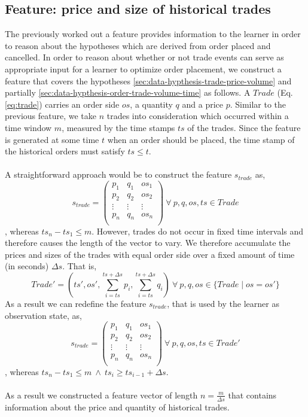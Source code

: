 \subsection{Feature: price and size of historical trades}
The previously worked out a feature provides information to the learner in order to reason about the hypotheses which are derived from order placed and cancelled.
In order to reason about whether or not trade events can serve as appropriate input for a learner to optimize order placement, we construct a feature that covers the hypotheses \ref{sec:data-hypthesis-trade-price-volume} and partially \ref{sec:data-hypthesis-order-trade-volume-time} as follows.
A $Trade$ (Eq. \ref{eq:trade}) carries an order side $os$, a quantity $q$ and a price $p$.
Similar to the previous feature, we take $n$ trades into consideration which occurred within a time window $m$, measured by the time stamps $ts$ of the trades.
Since the feature is generated at some time $t$ when an order should be placed, the time stamp of the historical orders must satisfy $ts \leq t$.
\\
\\
A straightforward approach would be to construct the feature $s_{trade}$ as,
\begin{equation}
    s_{trade} =\begin{pmatrix}
        p_1 & q_1 & os_1 \\
        p_2 & q_2 & os_2 \\
        \vdots & \vdots & \vdots\\
        p_n & q_n & os_n \\
    \end{pmatrix}
    \ \forall \ p, q, os, ts \in Trade
\end{equation}, whereas $ts_n - ts_1 \leq m$.
However, trades do not occur in fixed time intervals and therefore causes the length of the vector to vary.
We therefore accumulate the prices and sizes of the trades with equal order side over a fixed amount of time (in seconds) $\Delta{s}$.
That is,
\begin{equation}
    Trade' = (ts', os', \sum_{i=ts}^{ts+\Delta{s}}p_i, \sum_{i=ts}^{ts+\Delta{s}}q_i)
    \ \forall \ p, q, os \in \{Trade \mid os = os'\}
\end{equation}
As a result we can redefine the feature $s_{trade}$, that is used by the learner as observation state, as,
\begin{equation}
    s_{trade} =\begin{pmatrix}
        p_1 & q_1 & os_1 \\
        p_2 & q_2 & os_2 \\
        \vdots & \vdots & \vdots\\
        p_n & q_n & os_n \\
    \end{pmatrix}
    \ \forall \ p, q, os, ts \in Trade'
\end{equation}, whereas $ts_n - ts_1 \leq m \ \land \ ts_i \geq ts_{i-1} + \Delta{s}$.
\hfill
\\
\\
As a result we constructed a feature vector of length $n = \frac{m}{\Delta{s}}$ that contains information about the price and quantity of historical trades.

